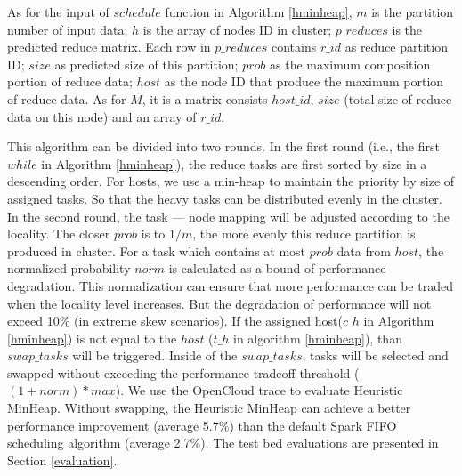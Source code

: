 As for the input of $schedule$ function in Algorithm \ref{hminheap}, $m$ is the partition number of input data; $h$ is the array of nodes ID in cluster; $p\_reduces$ is the predicted reduce matrix. Each row in $p\_reduces$ contains $r\_id$ as reduce partition ID; $size$ as predicted size of this partition; $prob$ as the maximum composition portion of reduce data; $host$ as the node ID that produce the maximum portion of reduce data. As for $M$, it is a matrix consists $host\_id$, $size$ (total size of reduce data on this node) and an array of $r\_id$.

This algorithm can be divided into two rounds. In the first round (i.e., the first $while$ in Algorithm \ref{hminheap}), the reduce tasks are first sorted by size in a descending order. For hosts, we use a min-heap to maintain the priority by size of assigned tasks. So that the heavy tasks can be distributed evenly in the cluster.
In the second round, the task --- node mapping will be adjusted according to the locality. The closer $prob$ is to $1/m$, the more evenly this reduce partition is produced in cluster. For a task which contains at most $prob$ data from $host$, the normalized probability $norm$ is calculated as a bound of performance degradation. This normalization can ensure that more performance can be traded when the locality level increases. But the degradation of performance will not exceed 10\% (in extreme skew scenarios). If the assigned host($c\_h$ in Algorithm \ref{hminheap}) is not equal to the $host$ ($t\_h$ in algorithm \ref{hminheap}), than $swap\_tasks$ will be triggered.
Inside of the $swap\_tasks$, tasks will be selected and swapped without exceeding the performance tradeoff threshold ($\left(1+norm\right)*max$). We use the OpenCloud \cite{opencloudtrace} trace to evaluate Heuristic MinHeap. Without swapping, the Heuristic MinHeap can achieve a better performance improvement (average 5.7\%) than the default Spark FIFO scheduling algorithm (average 2.7\%). The test bed evaluations are presented in Section \ref{evaluation}.


